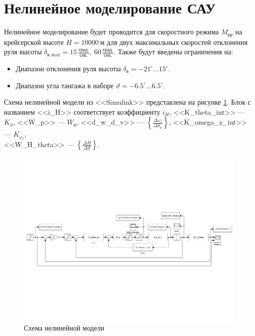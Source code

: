 \section{Нелинейное моделирование САУ}
Нелинейное моделирование будет проводится для скоростного режима $M_\text{кр}$
на крейсерской высоте $H = 10000\ \text{м}$ для двух максимальных скоростей
отклонения руля высоты $\dot{\delta}_\text{в max} = 15\, \frac{\text{град.}}{\text{сек.}},\ 60\, \frac{\text{град.}}{\text{сек.}}$. Также будут введены ограничения на:

\begin{itemize}
    \item Диапазон отклонения руля высоты $\delta_\text{в} = -21^\circ ... 15^\circ$.
    \item Диапазон угла тангажа в наборе $\vartheta = -6.5^\circ...6.5^\circ$.
\end{itemize}

Схема нелинейной модели из <<Simulink>> представлена на рисунке \ref{fig:nonlinear_model_simulink}. 
Блок с названием <<i\_H>> соответствует коэффициенту $i_H$, <<K\_theta\_int>>
---  $K_\vartheta$, <<W\_p>> --- $W_{п}$, <<d\_w\_d\_v>> --- $\left\{ \frac{\Delta
\omega_z}{\Delta \delta_{в}} \right\} $, <<K\_omega\_z\_int>> --- $K_{\omega_z}$,\\
<<W\_H\_theta>> --- $\left\{ \frac{\Delta H}{\Delta \vartheta} \right\} $.

\begin{figure}[H]
    \centering
    \includegraphics[clip, trim=0.4cm 6cm 0.4cm 7cm , width=1.00\textwidth]{./figures/model.pdf}
    \caption{Схема нелинейной модели}
    \label{fig:nonlinear_model_simulink}
\end{figure}

